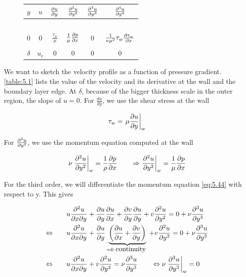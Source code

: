 	\begin{figure}
	\vspace{-5mm}
	\begin{tabular}{c|ccccc}
	 $y$ & $u$ & $\frac{\D u}{\D y}$ & $\frac{\D ^2 u}{\D y^2}$ & $\frac{\D ^3 u}{\D y^3}$ & $\frac{\D ^4 u}{\D y^4}$ \\
	 \hline 
	 	 \ \\ $0$       & 0 & $\frac{\tau _w}{\mu}$ & $\frac{1}{\mu}\frac{\D p}{\D x}$ & 0 & $\frac{1}{\nu \mu ^2}\tau _w \frac{\D\tau _w}{\D x}$  \\ \\
	 $\delta$ & $u_e$ & 0 & 0 & 0 & 0 \\ 
	 \hline 
	 \end{tabular}  
	 \label{table:5.1}
	 \end{figure}
	We want to sketch the velocity profile as a function of pressure gradient. \autoref{table:5.1} lists the value of the velocity and its derivative at the wall and the boundary layer edge. At $\delta$, because of the bigger thickness scale in the outer region, the slope of $u = 0$. For $\frac{du}{dy}$, we use the shear stress at the wall

	\begin{equation}
		\tau _w = \left. \mu \frac{\D u}{\D y}\right| _w
	\end{equation}
	
	For $\frac{\D ^2 u}{\D y^2}$, we use the momentum equation computed at the wall
	
	\begin{equation}
		\nu \left.\frac{\D ^2 u}{\D y^2}\right| _w = \frac{1}{\rho}\frac{\D p}{\D x} \qquad \Rightarrow \left.\frac{\D ^2 u}{\D y^2}\right| _w  = \frac{1}{\mu}\frac{\D p}{\D x}
	\end{equation}
	
	For the third order, we will differentiate the momentum equation \eqref{eq:5.44} with respect to y. This gives
	
	\begin{equation}
	\begin{aligned}
		&u \frac{\D ^2 u}{\D x \D y} + \frac{\D u}{\D y}\frac{\D u}{\D x} + \frac{\D v}{\D y} \frac{\D u}{\D y} + v \frac{\D ^2 u}{\D y^2} =0+ \nu \frac{\D ^3 u}{\D y^3}\\
		\Leftrightarrow  \qquad
		&u \frac{\D ^2 u}{\D x \D y} + \frac{\D u}{\D y}\underbrace{\left(\frac{\D u}{\D x} + \frac{\D v}{\D y}\right)}_{=0 \mbox{ continuity }} + v \frac{\D ^2 u}{\D y^2} =0+ \nu \frac{\D ^3 u}{\D y^3} \\
		\Leftrightarrow  \qquad 
		&u \frac{\D ^2 u}{\D x \D y} + v \frac{\D ^2 u}{\D y^2} =  \nu \frac{\D ^3 u}{\D y^3} \qquad \Leftrightarrow \nu \left.\frac{\D ^3 u}{\D y^3}\right| _w = 0 
	\end{aligned}
	\end{equation}
	
